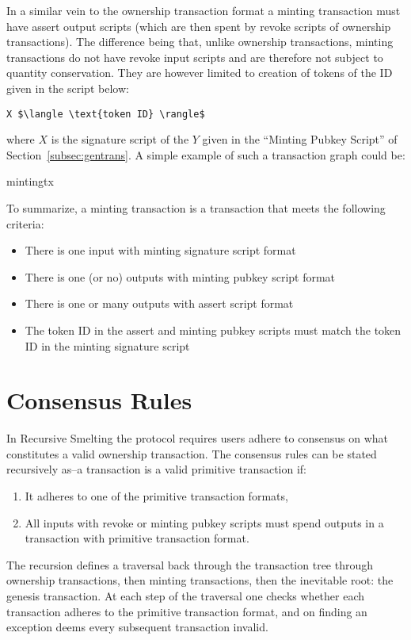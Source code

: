\documentclass[9pt,oneside]{amsart}
\begin{document}
\begin{multicols}{2}
In a similar vein to the ownership transaction format a minting transaction must have assert output scripts (which are then spent by revoke scripts of ownership transactions). The difference being that, unlike ownership transactions, minting transactions do not have revoke input scripts and are therefore not subject to quantity conservation. They are however limited to creation of tokens of the ID given in the script below:

\begin{lstlisting}[title={\textbf{Minting Signature Script}}]
X $\langle \text{token ID} \rangle$
\end{lstlisting}
where $X$ is the signature script of the $Y$ given in the ``Minting Pubkey Script'' of Section~\ref{subsec:gentrans}. A simple example of such a transaction graph could be: 
\begin{center}
{mintingtx}
\end{center}

To summarize, a minting transaction is a transaction that meets the following criteria:
\begin{itemize}
    \item There is one input with minting signature script format
    \item There is one (or no) outputs with minting pubkey script format
    \item There is one or many outputs with assert script format
    \item The token ID in the assert and minting pubkey scripts must match the token ID in the minting signature script
\end{itemize}

\section{Consensus Rules}
In Recursive Smelting the protocol requires users adhere to consensus on what constitutes a valid ownership transaction. The consensus rules can be stated recursively as--a  transaction is a valid primitive transaction if:
    \begin{enumerate}
        \item It adheres to one of the primitive transaction formats,
        \item All inputs with revoke or minting pubkey scripts must  spend outputs in a transaction with primitive transaction format.
    \end{enumerate}
    
The recursion defines a traversal back through the transaction tree through ownership transactions, then minting transactions, then the inevitable root: the genesis transaction. At each step of the traversal one checks whether each transaction adheres to the primitive transaction format, and on finding an exception deems every subsequent transaction invalid.
    

\end{multicols}
\end{document}
